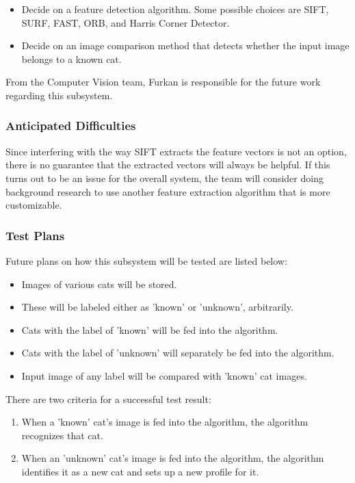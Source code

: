 \begin{itemize}
    \item Decide on a feature detection algorithm. Some possible choices are SIFT, SURF, FAST, ORB, and Harris Corner Detector.
    \item Decide on an image comparison method that detects whether the input image belongs to a known cat.
\end{itemize}

From the Computer Vision team, Furkan is responsible for the future work regarding this subsystem.

\subsubsection{Anticipated Difficulties}

Since interfering with the way SIFT extracts the feature vectors is not an option, there is no guarantee that the extracted vectors will always be helpful. If this turns out to be an issue for the overall system, the team will consider doing background research to use another feature extraction algorithm that is more customizable.

\subsubsection{Test Plans}

Future plans on how this subsystem will be tested are listed below:

\begin{itemize}
    \item Images of various cats will be stored.
    \item These will be labeled either as 'known' or 'unknown', arbitrarily.
    \item Cats with the label of 'known' will be fed into the algorithm.
    \item Cats with the label of 'unknown' will separately be fed into the algorithm.
    \item Input image of any label will be compared with 'known' cat images.
\end{itemize}

There are two criteria for a successful test result:

\begin{enumerate}
    \item When a 'known' cat's image is fed into the algorithm, the algorithm recognizes that cat.
    \item When an 'unknown' cat's image is fed into the algorithm, the algorithm identifies it as a new cat and sets up a new profile for it.
\end{enumerate}

